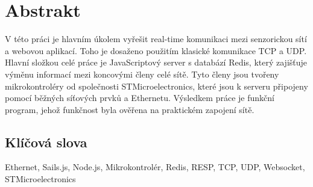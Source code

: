 \chapter*{Abstrakt}
V této práci je hlavním úkolem vyřešit real-time komunikaci mezi senzorickou sítí a webovou aplikací. Toho je dosaženo použitím klasické komunikace TCP a UDP. Hlavní složkou celé práce je JavaScriptový server s databází Redis, který zajišťuje výměnu informací mezi koncovými členy celé sítě. Tyto členy jsou tvořeny mikrokontroléry od společnosti STMicroelectronics, které jsou k serveru připojeny pomocí běžných síťových prvků a Ethernetu. Výsledkem práce je funkční program, jehož funkčnost byla ověřena na praktickém zapojení sítě.

\vfill

\section*{Klíčová slova}
Ethernet, Sails.js, Node.js, Mikrokontrolér, Redis, RESP, TCP, UDP, Websocket, STMicroelectronics